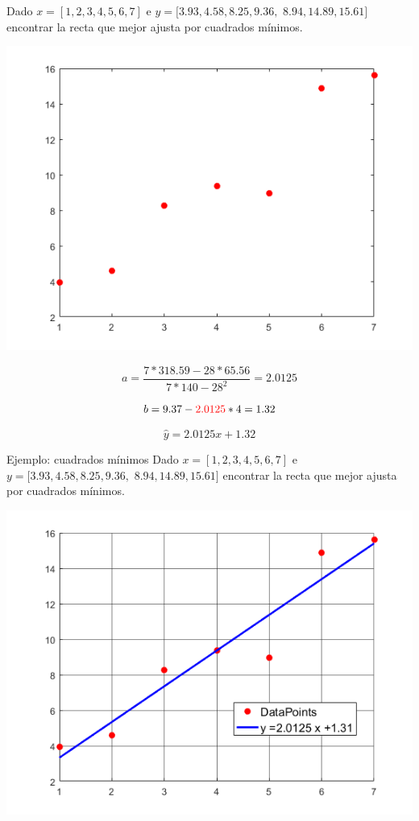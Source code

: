 \documentclass[xcolor=svgnames]{beamer} %
\theoremstyle{plain}
\theoremstyle{definition}
\begin{document}
\begin{frame}
  Dado $x = [1, 2, 3, 4, 5, 6, 7]$ e $y = [3.93, 4.58, 8.25, 9.36,$ $ 8.94, 14.89, 15.61]$ encontrar la recta que mejor ajusta por cuadrados mínimos.
  
  \begin{minipage}{.3\linewidth}
    \includegraphics[width=\linewidth]{CuadradosMinimis/points.png} 
  \end{minipage}\vline \pause \begin{minipage}{.65\linewidth}
 	$$a = \frac{7*318.59 - 28*65.56} {7*140 - 28^2} = 2.0125$$

	$$b = 9.37 - {\color{red}2.0125} *4 = 1.32 $$
  \end{minipage} \pause
  
  \begin{tcolorbox}
   $$\hat y = 2.0125 x +1.32$$
  \end{tcolorbox}
\end{frame}


\begin{frame}{Ejemplo: cuadrados mínimos}
  Dado $x = [1, 2, 3, 4, 5, 6, 7]$ e $y = [3.93, 4.58, 8.25, 9.36,$ $ 8.94, 14.89, 15.61]$ encontrar la recta que mejor ajusta por cuadrados mínimos.
  
  \begin{center}
    \includegraphics[width=.7\linewidth]{CuadradosMinimis/points_line.png} 
  \end{center}

\end{frame}
\end{document}
